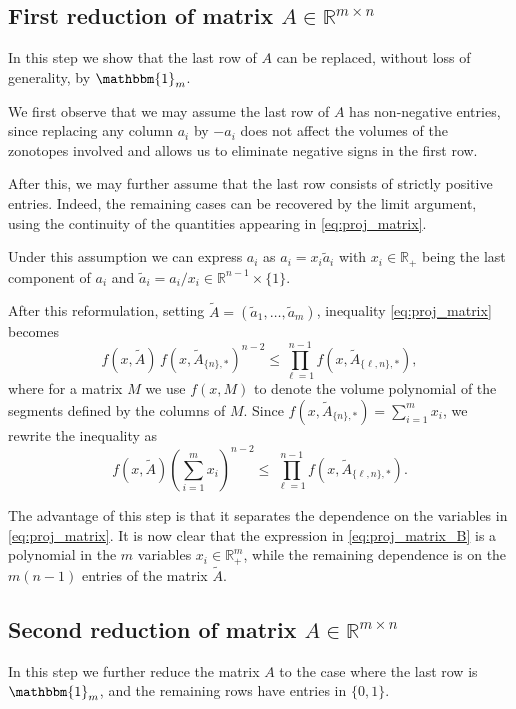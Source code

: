 \documentclass[11pt]{amsart}
\newcommand{\R}{\mathbb R}
\theoremstyle{definition}
\theoremstyle{remark}
\newcommand{\onevec}{\mathbbm{1}}
\begin{document}
\subsection{First reduction of matrix $A \in \mathbb{R}^{m \times n}$}
In this step we show that the last row of $A$ can be replaced, without loss of generality, by $\onevec_m$. 

We first observe that we may assume the last row of $A$ has non-negative entries, since replacing any column $a_i$ by $-a_i$ does not affect the volumes of the zonotopes involved and allows us to eliminate negative signs in the first row.

After this, we may further assume that the last row consists of strictly positive entries. Indeed, the remaining cases can be recovered by the limit argument, using the continuity of the quantities appearing in \eqref{eq:proj_matrix}.  

Under this assumption we can express $a_i$ as $a_i = x_i \tilde a_i$ with $x_i \in \R_+$ being the last component of $a_i$ and $\tilde a_i = a_i / x_i \in \R^{n-1}\times \{1 \} $. 

After this reformulation, setting $\tilde A = (\tilde a_1,\ldots,\tilde a_m)$, inequality \eqref{eq:proj_matrix} becomes
\[
f(x,\tilde A) \, f(x,\tilde A_{\{n\},\ast})^{n-2} \le \prod_{\ell=1}^{n-1} f(x,\tilde A_{\{\ell,n\},\ast}),
\]
where for a matrix $M$ we use $f(x,M)$ to denote the volume polynomial of the segments defined by the columns of $M$.
Since $f(x,\tilde A_{\{n\},\ast}) = \sum_{i=1}^m x_i$, we rewrite the inequality as
\begin{equation}\label{eq:proj_matrix_B}
f(x,\tilde A) \left(\sum_{i=1}^m x_i\right)^{n-2} \!\le\, \prod_{\ell=1}^{n-1} f(x,\tilde A_{\{\ell,n\},\ast}). 
\end{equation}


The advantage of this step is that it separates the dependence on the variables in \eqref{eq:proj_matrix}. 
It is now clear that the expression in \eqref{eq:proj_matrix_B} is a polynomial in the $m$ variables $x_i \in \mathbb{R}_+^m$, while the remaining dependence is on the $m(n-1)$ entries of the matrix $\tilde A$. %

\subsection{Second reduction of matrix $A \in \mathbb{R}^{m \times n}$}
In this step we further reduce the matrix $A$ to the case where the last row is $\onevec_m$, and the remaining rows have entries in $\{0,1\}$.
\end{document}
